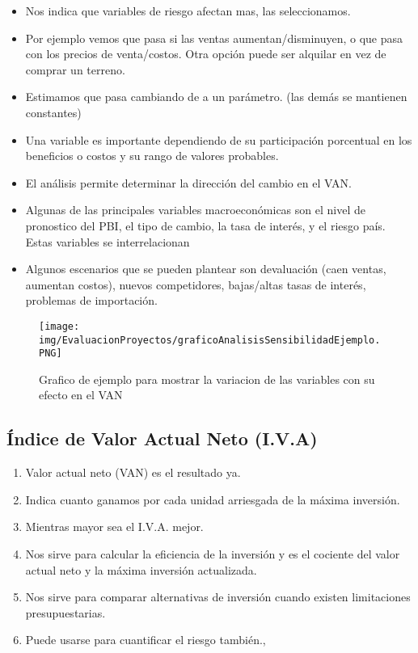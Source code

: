 \documentclass[titlepage,a4paper]{article}
\begin{document}
\begin{itemize}
\item Nos indica que variables de riesgo afectan mas, las seleccionamos.
\item Por ejemplo vemos que pasa si las ventas aumentan/disminuyen, o que pasa con los precios de venta/costos. Otra opción puede ser alquilar en vez de comprar un terreno.
\item Estimamos que pasa cambiando de a un parámetro. (las demás se mantienen constantes)
\item Una variable es importante dependiendo de su participación porcentual en los beneficios o costos y su rango de valores probables.
\item El análisis permite determinar la dirección del cambio en el VAN.
\item Algunas de las principales variables macroeconómicas son el nivel de pronostico del PBI, el tipo de cambio, la tasa de interés, y el riesgo país. Estas variables se interrelacionan
\item Algunos escenarios que se pueden plantear son devaluación (caen ventas, aumentan costos), nuevos competidores, bajas/altas tasas de interés, problemas de importación.
\end{itemize}

\begin{figure}[!htb]
    \centering
    \texttt{[image: img/EvaluacionProyectos/graficoAnalisisSensibilidadEjemplo.PNG]}
        \caption{Grafico de ejemplo para mostrar la variacion de las variables con su efecto en el VAN}
\end{figure}

\newpage
\subsection{Índice de Valor Actual Neto (I.V.A)}

\begin{enumerate}
\item Valor actual neto (VAN) es el resultado ya.
\item Indica cuanto ganamos por cada unidad arriesgada de la máxima inversión.
\item Mientras mayor sea el I.V.A. mejor.
\item Nos sirve para calcular la eficiencia de la inversión y es el cociente del valor actual neto y la máxima inversión actualizada.
\item Nos sirve para comparar alternativas de inversión cuando existen limitaciones presupuestarias.
\item Puede usarse para cuantificar el riesgo también.,
\end{enumerate}
\end{document}

